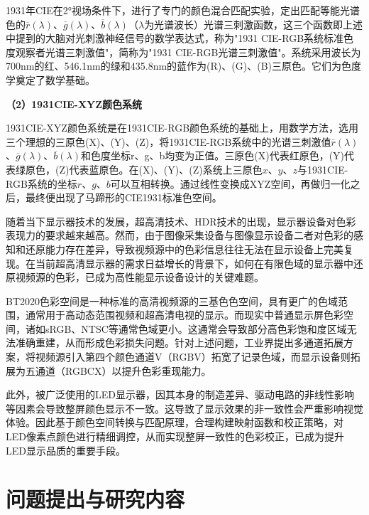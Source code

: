 1931年CIE在2°视场条件下，进行了专门的颜色混合匹配实验，定出匹配等能光谱色的$\overline{r}(\lambda)$、$\overline{g}(\lambda)$、$\overline{b}(\lambda)$（$\lambda$为光谱波长）光谱三刺激函数，这三个函数即上述中提到的大脑对光刺激神经信号的数学表达式，称为"1931 CIE-RGB系统标准色度观察者光谱三刺激值"，简称为"1931 CIE-RGB光谱三刺激值"。系统采用波长为700nm的红、546.1nm的绿和435.8nm的蓝作为(R)、(G)、(B)三原色。它们为色度学奠定了数学基础。

\noindent\textbf{（2）1931CIE-XYZ颜色系统}

1931CIE-XYZ颜色系统是在1931CIE-RGB颜色系统的基础上，用数学方法，选用三个理想的三原色(X)、(Y)、(Z)，将1931CIE-RGB系统中的光谱三刺激值$\overline{r}(\lambda)$、$\overline{g}(\lambda)$、$\overline{b}(\lambda)$和色度坐标r、g、b均变为正值。三原色(X)代表红原色，(Y)代表绿原色，(Z)代表蓝原色。在(X)、(Y)、(Z)系统上三原色$x$、$y$、$z$与1931CIE-RGB系统的坐标$r$、$g$、$b$可以互相转换。通过线性变换成XYZ空间，再做归一化之后，最终便出现了马蹄形的CIE1931标准色空间。

随着当下显示器技术的发展，超高清技术、HDR技术的出现，显示器设备对色彩表现力的要求越来越高。然而，由于图像采集设备与图像显示设备二者对色彩的感知和还原能力存在差异，导致视频源中的色彩信息往往无法在显示设备上完美复现。在当前超高清显示器的需求日益增长的背景下，如何在有限色域的显示器中还原视频源的色彩，已成为高性能显示设备设计的关键难题。

BT2020色彩空间是一种标准的高清视频源的三基色色空间，具有更广的色域范围，通常用于高动态范围视频和超高清电视的显示。而现实中普通显示屏色彩空间，诸如sRGB、NTSC等通常色域更小。这通常会导致部分高色彩饱和度区域无法准确重建，从而形成色彩损失问题。针对上述问题，工业界提出多通道拓展方案，将视频源引入第四个颜色通道V（RGBV）拓宽了记录色域，而显示设备则拓展为五通道（RGBCX）以提升色彩重现能力。

此外，被广泛使用的LED显示器，因其本身的制造差异、驱动电路的非线性影响等因素会导致整屏颜色显示不一致。这导致了显示效果的非一致性会严重影响视觉体验。因此基于颜色空间转换与匹配原理，合理构建映射函数和校正策略，对LED像素点颜色进行精细调控，从而实现整屏一致性的色彩校正，已成为提升LED显示品质的重要手段。

\section[\hspace{-2pt}问题提出与研究内容]{{\heiti{} \hspace{-8pt}问题提出与研究内容}}\label{section1: 问题提出与研究内容}

